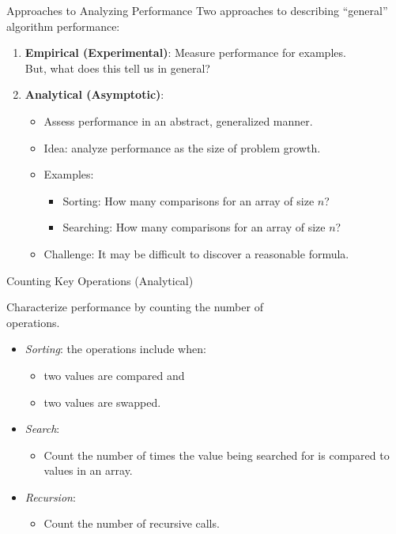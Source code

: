 \documentclass[14pt,aspectratio=1610, hyperref={pdfpagelayout=SinglePage}]{beamer}
\begin{document}
\begin{frame}{Approaches to Analyzing Performance}
  Two approaches to describing ``general'' algorithm performance:
  \begin{enumerate}
  \item<2->
    \textbf{Empirical (Experimental)}: Measure performance for examples.\\ But, what does this tell us in general?
  \item<3->
    \textbf{Analytical (Asymptotic)}:
    \begin{itemize}
    \item<4-> Assess performance in an abstract, generalized manner.
    \item<5-> Idea: analyze performance as the size of problem growth.
    \item<6-> Examples:
    \begin{itemize}
    \item Sorting: How many comparisons for an array of size \(n\)?
    \item Searching: How many comparisons for an array of size \(n\)?
    \end{itemize}
    \item<7-> Challenge: It may be difficult to discover a reasonable formula.
    \end{itemize}
  \end{enumerate}
\end{frame}


\begin{frame}{Counting Key Operations (Analytical)}

Characterize performance by counting the number of\\ operations.

\begin{itemize}
\item <2->
  \emph{Sorting}: the operations include when:
  \begin{itemize}
  \item
    two values are compared and
  \item
    two values are swapped.
  \end{itemize}
\item <3->
  \emph{Search}:
  \begin{itemize}
  \item
    Count the number of times the value being searched for is compared to values in an array.
  \end{itemize}
\item <4->
  \emph{Recursion}:
  \begin{itemize}
  \item
    Count the number of recursive calls.
  \end{itemize}
\end{itemize}


\end{frame}
\end{document}

